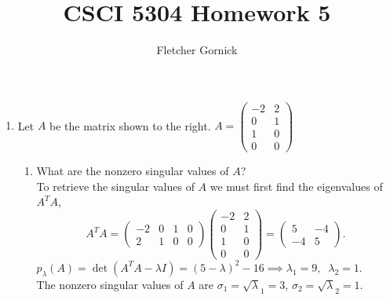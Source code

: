 \documentclass[11pt]{article}
\title{\vspace{-1.0cm}CSCI 5304 Homework 5}
\author{Fletcher Gornick}
\newcommand{\n}{\vspace{0.3cm}}
\begin{document}
\maketitle
\begin{enumerate}
	\item Let \(A\) be the matrix shown to the right.
			      \(A = \left( \begin{array}{rr} -2 & 2 \\ 0 & 1 \\ 1 & 0 \\ 0 & 0 \end{array} \right)\)
\begin{enumerate}
	\item What are the nonzero singular values of \(A\)? \n\\
	      To retrieve the singular values of \(A\) we must first find the eigenvalues of \(A^T A\),
	      \[A^T A =
	      \left( \begin{array}{rrrr} -2 & 0 & 1 & 0 \\ 2 & 1 & 0 & 0 \end{array} \right)
	      \left( \begin{array}{rr} -2 & 2 \\ 0 & 1 \\ 1 & 0 \\ 0 & 0 \end{array} \right)
	      = \left( \begin{array}{rr} 5 & -4 \\ -4 & 5 \end{array} \right).
	      \]
	      \(p_\lambda(A) = \det(A^T A - \lambda I) = (5 - \lambda)^2 - 16 \implies \lambda_1 = 9, \;\; \lambda_2 = 1\). \n\\
	      The nonzero singular values of \(A\) are \(\sigma_1 = \sqrt\lambda_1 = 3\), \(\sigma_2 = \sqrt\lambda_2 = 1\). \n


\end{enumerate}
\end{enumerate}
\end{document}
